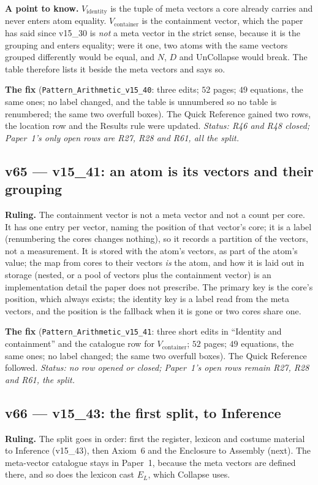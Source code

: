 \documentclass[11pt]{article}
\begin{document}
\textbf{A point to know.} $V_{\text{identity}}$ is the tuple of meta vectors a core already carries and never enters atom equality. $V_{\text{container}}$ is the containment vector, which the paper has said since v15\_30 is \emph{not} a meta vector in the strict sense, because it is the grouping and enters equality; were it one, two atoms with the same vectors grouped differently would be equal, and $N$, $D$ and UnCollapse would break. The table therefore lists it beside the meta vectors and says so.

\textbf{The fix} (\texttt{Pattern\_Arithmetic\_v15\_40}: three edits; $52$ pages; $49$ equations, the same ones; no label changed, and the table is unnumbered so no table is renumbered; the same two overfull boxes). The Quick Reference gained two rows, the location row and the Results rule were updated.
\emph{Status: R46 and R48 closed; Paper~1's only open rows are R27, R28 and R61, all the split.}

\subsection*{v65 --- v15\_41: an atom is its vectors and their grouping}
\textbf{Ruling.} The containment vector is not a meta vector and not a count per core. It has one entry per vector, naming the position of that vector's core; it is a label (renumbering the cores changes nothing), so it records a partition of the vectors, not a measurement. It is stored with the atom's vectors, as part of the atom's value; the map from cores to their vectors \emph{is} the atom, and how it is laid out in storage (nested, or a pool of vectors plus the containment vector) is an implementation detail the paper does not prescribe. The primary key is the core's position, which always exists; the identity key is a label read from the meta vectors, and the position is the fallback when it is gone or two cores share one.

\textbf{The fix} (\texttt{Pattern\_Arithmetic\_v15\_41}: three short edits in ``Identity and containment'' and the catalogue row for $V_{\text{container}}$; $52$ pages; $49$ equations, the same ones; no label changed; the same two overfull boxes). The Quick Reference followed.
\emph{Status: no row opened or closed; Paper~1's open rows remain R27, R28 and R61, the split.}

\subsection*{v66 --- v15\_43: the first split, to Inference}
\textbf{Ruling.} The split goes in order: first the register, lexicon and costume material to Inference (v15\_43), then Axiom~6 and the Enclosure to Assembly (next). The meta-vector catalogue stays in Paper~1, because the meta vectors are defined there, and so does the lexicon cast $E_L$, which Collapse uses.
\end{document}
